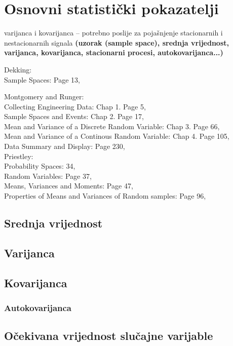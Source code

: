 \documentclass[a4paper,12pt,oneside]{memoir}
\begin{document}
        \section{Osnovni statistički pokazatelji}
            varijanca i kovarijanca -- potrebno poslije za pojašnjenje stacionarnih i nestacionarnih signala
            \textbf{(uzorak (sample space), srednja vrijednost, varijanca, kovarijanca, stacionarni procesi, autokovarijanca...)}

            Dekking:\\
            Sample Spaces: Page 13,


            
            Montgomery and Runger:\\
            Collecting Engineering Data: Chap 1. Page 5,\\
            Sample Spaces and Events: Chap 2. Page 17,\\
            Mean and Variance of a Discrete Random Variable: Chap 3. Page 66,\\
            Mean and Variance of a Continous Random Variable: Chap 4. Page 105,\\
            Data Summary and Display: Page 230,\\


            Priestley:\\
                Probability Spaces: 34,\\
                Random Variables: Page 37,\\
                Means, Variances and Moments: Page 47,\\
                Properties of Means and Variances of Random samples: Page 96,\\
            \subsection{Srednja vrijednost}
            \subsection{Varijanca}
            \subsection{Kovarijanca}
                \subsubsection{Autokovarijanca}
            \subsection{Očekivana vrijednost slučajne varijable}
\end{document}
